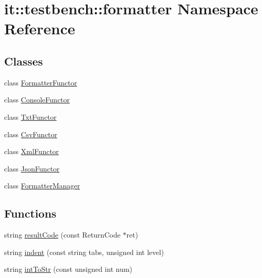 \hypertarget{namespaceit_1_1testbench_1_1formatter}{\section{it\-:\-:testbench\-:\-:formatter Namespace Reference}
\label{dc/d8b/namespaceit_1_1testbench_1_1formatter}
}
\subsection*{Classes}
\begin{DoxyCompactItemize}
\item 
class \hyperlink{classit_1_1testbench_1_1formatter_1_1FormatterFunctor}{Formatter\-Functor}
\item 
class \hyperlink{classit_1_1testbench_1_1formatter_1_1ConsoleFunctor}{Console\-Functor}
\item 
class \hyperlink{classit_1_1testbench_1_1formatter_1_1TxtFunctor}{Txt\-Functor}
\item 
class \hyperlink{classit_1_1testbench_1_1formatter_1_1CsvFunctor}{Csv\-Functor}
\item 
class \hyperlink{classit_1_1testbench_1_1formatter_1_1XmlFunctor}{Xml\-Functor}
\item 
class \hyperlink{classit_1_1testbench_1_1formatter_1_1JsonFunctor}{Json\-Functor}
\item 
class \hyperlink{classit_1_1testbench_1_1formatter_1_1FormatterManager}{Formatter\-Manager}
\end{DoxyCompactItemize}
\subsection*{Functions}
\begin{DoxyCompactItemize}
\item 
string \hyperlink{namespaceit_1_1testbench_1_1formatter_a7af7944336ec0342246cc31437350332}{result\-Code} (const Return\-Code $\ast$ret)
\item 
string \hyperlink{namespaceit_1_1testbench_1_1formatter_a3fecb000304db9d8cab64245de815490}{indent} (const string tabs, unsigned int level)
\item 
string \hyperlink{namespaceit_1_1testbench_1_1formatter_a386c4632e9244f987979acd233a3bd0b}{int\-To\-Str} (const unsigned int num)
\end{DoxyCompactItemize}
